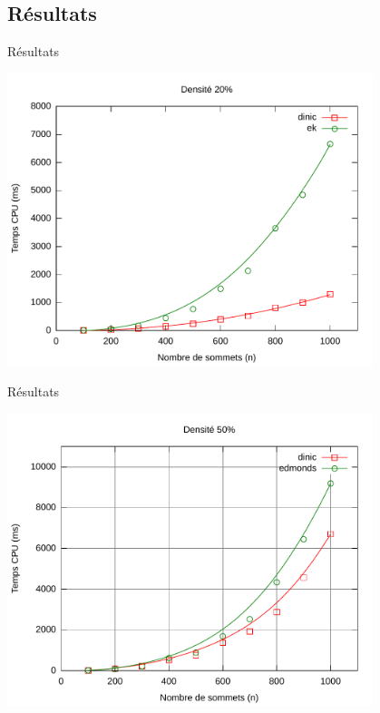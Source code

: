 \subsection{Résultats}
\begin{frame}{Résultats}
\begin{center}
\includegraphics[width=0.8\textwidth]{img/c20}
\end{center}
\end{frame}
\begin{frame}{Résultats}
\begin{center}
\includegraphics[width=0.8\textwidth]{img/c50}
\end{center}
\end{frame}
